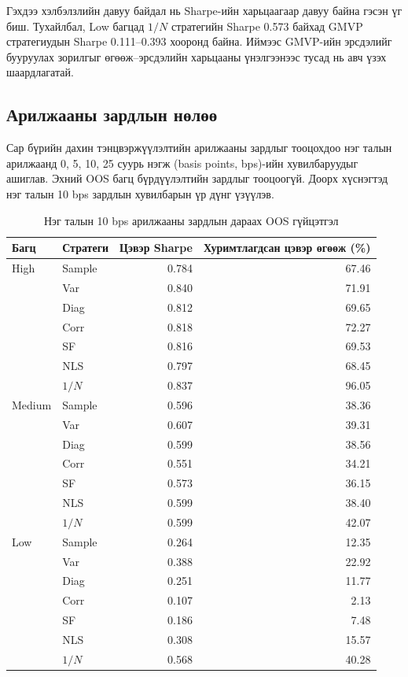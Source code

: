 Гэхдээ хэлбэлзлийн давуу байдал нь
Sharpe-ийн харьцаагаар давуу байна
гэсэн үг биш. Тухайлбал, Low багцад
$1/N$ стратегийн Sharpe 0.573 байхад
GMVP стратегиудын Sharpe 0.111--0.393
хооронд байна. Иймээс GMVP-ийн
эрсдэлийг бууруулах зорилгыг
өгөөж--эрсдэлийн харьцааны үнэлгээнээс
тусад нь авч үзэх шаардлагатай.

\subsection{Арилжааны зардлын нөлөө}
\label{subsec:trading_cost_results}

Сар бүрийн дахин тэнцвэржүүлэлтийн
арилжааны зардлыг тооцохдоо нэг талын
арилжаанд 0, 5, 10, 25 суурь нэгж
(basis points, bps)-ийн хувилбаруудыг
ашиглав. Эхний OOS багц бүрдүүлэлтийн
зардлыг тооцоогүй. Доорх хүснэгтэд
нэг талын 10 bps зардлын хувилбарын
үр дүнг үзүүлэв.

\begin{table}[htbp]
	\centering
	\caption{Нэг талын 10 bps арилжааны зардлын дараах OOS гүйцэтгэл}
	\label{tab:trading_cost_results}
	\small
	\begin{tabular}{llrr}
		\hline
		Багц & Стратеги &
		Цэвэр Sharpe &
		Хуримтлагдсан цэвэр өгөөж (\%) \\
		\hline
		High & Sample & 0.784 & 67.46 \\
		& Var & 0.840 & 71.91 \\
		& Diag & 0.812 & 69.65 \\
		& Corr & 0.818 & 72.27 \\
		& SF & 0.816 & 69.53 \\
		& NLS & 0.797 & 68.45 \\
		& $1/N$ & 0.837 & 96.05 \\
		\hline
		Medium & Sample & 0.596 & 38.36 \\
		& Var & 0.607 & 39.31 \\
		& Diag & 0.599 & 38.56 \\
		& Corr & 0.551 & 34.21 \\
		& SF & 0.573 & 36.15 \\
		& NLS & 0.599 & 38.40 \\
		& $1/N$ & 0.599 & 42.07 \\
		\hline
		Low & Sample & 0.264 & 12.35 \\
		& Var & 0.388 & 22.92 \\
		& Diag & 0.251 & 11.77 \\
		& Corr & 0.107 & 2.13 \\
		& SF & 0.186 & 7.48 \\
		& NLS & 0.308 & 15.57 \\
		& $1/N$ & 0.568 & 40.28 \\
		\hline
	\end{tabular}
\end{table}

